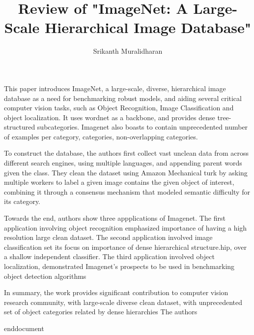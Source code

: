 \documentclass[]{article}
\title{Review of "ImageNet: A Large-Scale Hierarchical Image Database"}
\author{Srikanth Muralidharan}
\begin{document}
\maketitle

This paper introduces ImageNet, a large-scale, diverse, hierarchical image database as a need for benchmarking robust models, and aiding several critical computer vision tasks, 
such as Object Recognition, Image Classification and object localization. It uses wordnet as a backbone, and provides dense
tree-structured subcategories. Imagenet also boasts to contain unprecedented number of examples per category, categories,
non-overlapping categories.
\par
To construct the database, the authors first collect vast unclean data from across different search engines, using multiple
languages, and appending parent words given the class. They clean the dataset using Amazon Mechanical turk by
asking multiple workers to label a given image contains the given object of interest, combining it through a consensus
mechanism that modeled semantic difficulty for its category.
\par
Towards the end, authors show three appplications of Imagenet. The first application involving  object recognition emphasized importance
of having a high resolution large clean dataset. The second application involved image classification set its focus on importance of dense 
hierarchical structure.hip, over a shallow independent classifier. The third application involved object localization, demonstrated Imagenet's 
prospects to be used in benchmarking object detection algorithms 
\par
In summary, the work provides significant contribution to computer vision research community, with large-scale diverse
clean dataset, with unprecedented set of object categories related by dense hierarchies  The authors 

end{document}          
\end{document}
